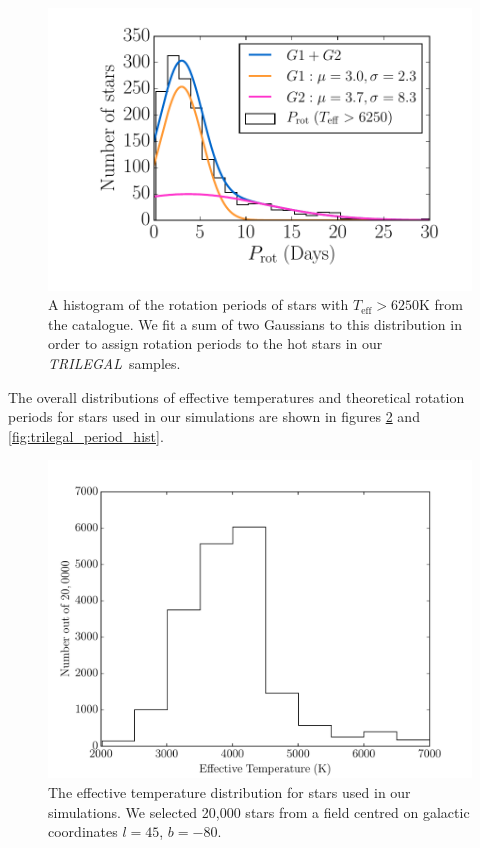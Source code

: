\documentclass[useAMS, usenatbib, preprint, 12pt]{aastex}
\newcommand{\LSST}{{\it LSST}}
\newcommand{\trilegal}{{\it TRILEGAL}}
\begin{document}
\begin{figure}
\begin{center}
\includegraphics[width=6in, clip=true]{figures/hot_star_hist.pdf}
\caption[A histogram of the rotation periods of hot stars]
{A histogram of the rotation periods of stars with $T_{\mathrm{eff}} > 6250$K
from the \citet{Mcquillan2014} catalogue.
We fit a sum of two Gaussians to this distribution in order to assign rotation
periods to the hot stars in our \trilegal\ samples.}
\label{fig:hot_star_hist}
\end{center}
\end{figure}

The overall distributions of effective temperatures and theoretical rotation
periods for stars used in our simulations are shown in figures
\ref{fig:trilegal_teff_hist} and \ref{fig:trilegal_period_hist}.

\begin{figure}
\begin{center}
\includegraphics[width=6in, clip=true]{figures/trilegal_teff_hist-80.pdf}
\caption[The effective temperature distribution for stars used in \LSST\
simulations]
{The effective temperature distribution for stars used in our simulations.
We selected 20,000 stars from a field centred on galactic coordinates $l=45$,
$b=-80$.}
\label{fig:trilegal_teff_hist}
\end{center}
\end{figure}
\end{document}
